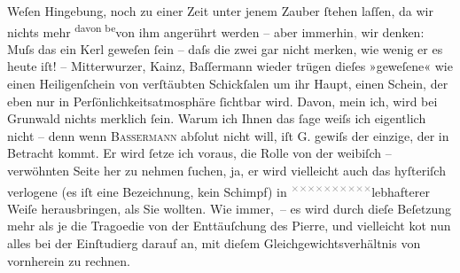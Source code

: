                Weſen Hingebung, noch zu einer Zeit unter jenem Zauber{ }ſtehen laſſen, da wir nichts
               mehr \substVorne{}\textsuperscript{davon be}\substDazwischen{}von ihm\substHinten{} angerührt werden – aber immerhin\textcolor{gray}{,} wir denken: Muſs das
               ein Kerl geweſen{ }ſein – daſs die zwei gar nicht merken, wie wenig er es heute iſt! –
                  Mitterwurzer, Kainz, Baſſermann wieder
               trügen dieſes »geweſene« wie einen Heiligenſchein von verſtäubten Schickſalen um ihr
               Haupt, einen Schein, der eben nur in Perſönlichkeitsatmosphäre{ }ſichtbar {\pb}wird. Davon, mein ich, wird bei Grunwald nichts merklich{ }ſein. Warum ich Ihnen das{ }ſage weiſs
               ich eigentlich nicht – denn wenn \textsc{Bassermann} abſolut nicht will, iſt G. gewiſs der
               einzige, der in Betracht kommt. Er wird{ }ſetze ich voraus, die Rolle von der weibiſch
                   – verwöhnten Seite her zu nehmen{ }ſuchen,  ja, er wird vielleicht auch das hyſteriſch
               verlogene (es iſt eine Bezeichnung, kein Schimpf) in \substVorne{}\textsuperscript{\textcolor{gray}{×}\-\textcolor{gray}{×}\-\textcolor{gray}{×}\-\textcolor{gray}{×}\-\textcolor{gray}{×}\-\textcolor{gray}{×}\-\textcolor{gray}{×}\-\textcolor{gray}{×}\-\textcolor{gray}{×}\-\textcolor{gray}{×}}\substDazwischen{}lebhafterer\substHinten{} Weiſe herausbringen, als Sie wollten. Wie immer, – es {\pb}wird durch dieſe Beſetzung  mehr als je die Tragoedie von der Enttäuſchung des Pierre, und vielleicht ko{\geminationm}t nun alles bei der Einſtudierg darauf an, mit dieſem
               Gleichgewichtsverhältnis von vornherein zu rechnen.\pend
           
